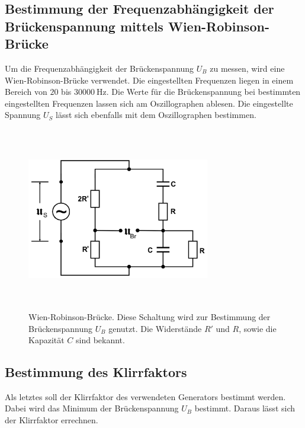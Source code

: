 \subsection{Bestimmung der Frequenzabhängigkeit der Brückenspannung mittels Wien-Robinson-Brücke}
Um die Frequenzabhängigkeit der Brückenspannung $U_B$ zu messen, wird eine 
Wien-Robinson-Brücke verwendet.
\newline
Die eingestellten Frequenzen liegen in einem Bereich von $\num{20}$ bis $\SI{30000}{\hertz}$.
Die Werte für die Brückenspannung bei bestimmten eingestellten Frequenzen
lassen sich am Oszillographen ablesen. %
Die eingestellte Spannung $U_S$ lässt sich ebenfalls mit dem Oszillographen
bestimmen.
\begin{figure}
    \centering
    \includegraphics[width=8cm, height=8cm]{build/wien-robinson.png}
    \caption{Wien-Robinson-Brücke. Diese Schaltung wird zur Bestimmung
    der Brückenspannung $U_B$ genutzt. Die Widerstände $R'$ und $R$,
    sowie die Kapazität $C$ sind bekannt.}
    \label{wien-robinson}
\end{figure}

\subsection{Bestimmung des Klirrfaktors}
Als letztes soll der Klirrfaktor des verwendeten Generators bestimmt werden.
\newline
Dabei wird das Minimum der Brückenspannung $U_B$ bestimmt.
Daraus lässt sich der Klirrfaktor errechnen.

